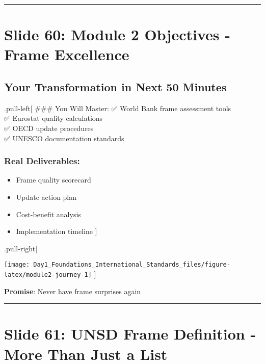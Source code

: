 \documentclass[
]{article}
\providecommand{\tightlist}{%
  \setlength{\itemsep}{0pt}\setlength{\parskip}{0pt}}
\begin{document}
\begin{center}\rule{0.5\linewidth}{0.5pt}\end{center}

\section{Slide 60: Module 2 Objectives - Frame
Excellence}\label{slide-60-module-2-objectives---frame-excellence}

\subsection{Your Transformation in Next 50
Minutes}\label{your-transformation-in-next-50-minutes}

.pull-left{[} \#\#\# You Will Master: ✅ World Bank frame assessment
tools\\
✅ Eurostat quality calculations\\
✅ OECD update procedures\\
✅ UNESCO documentation standards

\subsubsection{Real Deliverables:}\label{real-deliverables}

\begin{itemize}
\tightlist
\item
  Frame quality scorecard
\item
  Update action plan
\item
  Cost-benefit analysis
\item
  Implementation timeline {]}
\end{itemize}

.pull-right{[}

\texttt{[image: Day1\_Foundations\_International\_Standards\_files/figure-latex/module2-journey-1]}
{]}

\textbf{Promise}: Never have frame surprises again

\begin{center}\rule{0.5\linewidth}{0.5pt}\end{center}

\section{Slide 61: UNSD Frame Definition - More Than Just a
List}\label{slide-61-unsd-frame-definition---more-than-just-a-list}
\end{document}
